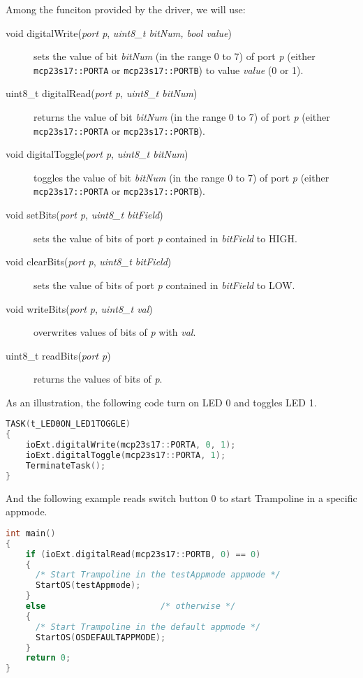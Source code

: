 \documentclass[11pt]{report}
\begin{document}
Among the funciton provided by the driver, we will use:

\begin{description}
    \item[void digitalWrite(\textit{port p}, \textit{uint8\_t bitNum, bool value})] sets the value of bit \textit{bitNum} (in the range 0 to 7) of port \textit{p} (either \texttt{mcp23s17::PORTA} or \texttt{mcp23s17::PORTB}) to value \textit{value} (0 or 1).

    \item[uint8\_t digitalRead(\textit{port p}, \textit{uint8\_t bitNum})] returns the value of bit \textit{bitNum} (in the range 0 to 7) of port \textit{p} (either \texttt{mcp23s17::PORTA} or \texttt{mcp23s17::PORTB}).

    \item[void digitalToggle(\textit{port p}, \textit{uint8\_t bitNum})] toggles the value of bit \textit{bitNum} (in the range 0 to 7) of port \textit{p} (either \texttt{mcp23s17::PORTA} or \texttt{mcp23s17::PORTB}).

    \item[void setBits(\textit{port p}, \textit{uint8\_t bitField})] sets the value of bits of port \textit{p} contained in \textit{bitField} to HIGH.

    \item[void clearBits(\textit{port p}, \textit{uint8\_t bitField})] sets the value of bits of port \textit{p} contained in \textit{bitField} to LOW.

    \item[void writeBits(\textit{port p}, \textit{uint8\_t val})] overwrites values of bits of \textit{p} with \textit{val}.

    \item[uint8_t readBits(\textit{port p})] returns the values of bits of \textit{p}.
\end{description}

As an illustration, the following code turn on LED 0 and toggles LED 1.

\begin{lstlisting}[language=C]
TASK(t_LED0ON_LED1TOGGLE)
{
    ioExt.digitalWrite(mcp23s17::PORTA, 0, 1);
    ioExt.digitalToggle(mcp23s17::PORTA, 1);
    TerminateTask();
}
\end{lstlisting}


And the following example reads switch button {0} to start Trampoline in a specific appmode.

\begin{lstlisting}[language=C]
int main()
{
    if (ioExt.digitalRead(mcp23s17::PORTB, 0) == 0)
    {
      /* Start Trampoline in the testAppmode appmode */
      StartOS(testAppmode);
    }
    else                       /* otherwise */
    {
      /* Start Trampoline in the default appmode */
      StartOS(OSDEFAULTAPPMODE);
    }
    return 0;
}
\end{lstlisting}
\end{document}
